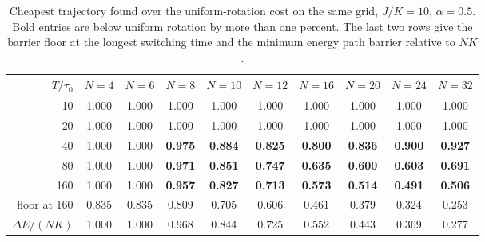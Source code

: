 \begin{table}[t]
\centering
\caption{Cheapest trajectory found over the uniform-rotation cost on the same grid, $J/K = 10$, $\alpha = 0.5$. Bold entries are below uniform rotation by more than one percent. The last two rows give the barrier floor at the longest switching time and the minimum energy path barrier relative to $NK$.}
\label{tab:alpha05}
\small
\begin{tabular}{rccccccccc}
\toprule
$T/\tau_0$ & $N=4$ & $N=6$ & $N=8$ & $N=10$ & $N=12$ & $N=16$ & $N=20$ & $N=24$ & $N=32$ \\
\midrule
10 & 1.000 & 1.000 & 1.000 & 1.000 & 1.000 & 1.000 & 1.000 & 1.000 & 1.000 \\
20 & 1.000 & 1.000 & 1.000 & 1.000 & 1.000 & 1.000 & 1.000 & 1.000 & 1.000 \\
40 & 1.000 & 1.000 & \textbf{0.975} & \textbf{0.884} & \textbf{0.825} & \textbf{0.800} & \textbf{0.836} & \textbf{0.900} & \textbf{0.927} \\
80 & 1.000 & 1.000 & \textbf{0.971} & \textbf{0.851} & \textbf{0.747} & \textbf{0.635} & \textbf{0.600} & \textbf{0.603} & \textbf{0.691} \\
160 & 1.000 & 1.000 & \textbf{0.957} & \textbf{0.827} & \textbf{0.713} & \textbf{0.573} & \textbf{0.514} & \textbf{0.491} & \textbf{0.506} \\
\midrule
floor at 160 & 0.835 & 0.835 & 0.809 & 0.705 & 0.606 & 0.461 & 0.379 & 0.324 & 0.253 \\
$\Delta E/(NK)$ & 1.000 & 1.000 & 0.968 & 0.844 & 0.725 & 0.552 & 0.443 & 0.369 & 0.277 \\
\bottomrule
\end{tabular}
\end{table}
